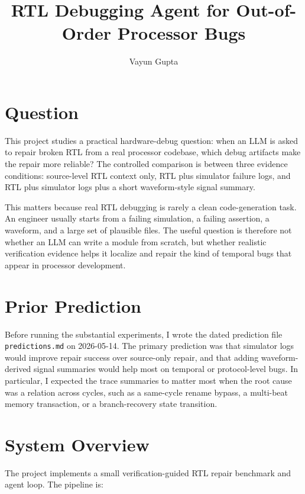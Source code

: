 \documentclass[11pt]{article}
\title{RTL Debugging Agent for Out-of-Order Processor Bugs}
\author{Vayun Gupta}
\date{}
\begin{document}
\maketitle

\section*{Question}
This project studies a practical hardware-debug question: when an LLM is asked
to repair broken RTL from a real processor codebase, which debug artifacts make
the repair more reliable? The controlled comparison is between three evidence
conditions: source-level RTL context only, RTL plus simulator failure logs, and
RTL plus simulator logs plus a short waveform-style signal summary.

This matters because real RTL debugging is rarely a clean code-generation task.
An engineer usually starts from a failing simulation, a failing assertion, a
waveform, and a large set of plausible files. The useful question is therefore
not whether an LLM can write a module from scratch, but whether realistic
verification evidence helps it localize and repair the kind of temporal bugs
that appear in processor development.

\section*{Prior Prediction}
Before running the substantial experiments, I wrote the dated prediction file
\texttt{predictions.md} on 2026-05-14. The primary prediction was that simulator
logs would improve repair success over source-only repair, and that adding
waveform-derived signal summaries would help most on temporal or protocol-level
bugs. In particular, I expected the trace summaries to matter most when the root
cause was a relation across cycles, such as a same-cycle rename bypass, a
multi-beat memory transaction, or a branch-recovery state transition.

\section*{System Overview}
The project implements a small verification-guided RTL repair benchmark and
agent loop. The pipeline is:
\end{document}

